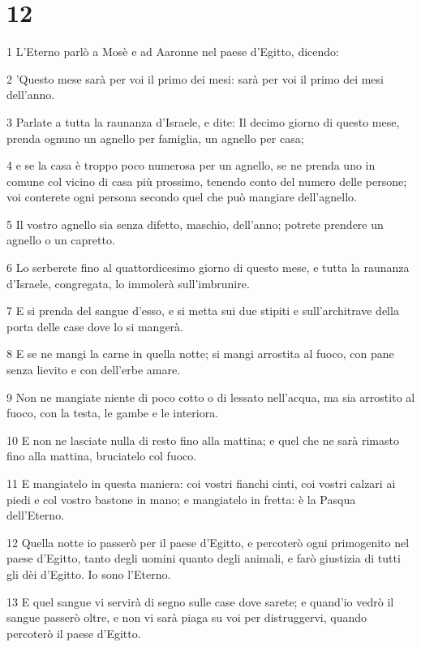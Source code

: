 \chapter{12}

\par 1 L'Eterno parlò a Mosè e ad Aaronne nel paese d'Egitto, dicendo:
\par 2 'Questo mese sarà per voi il primo dei mesi: sarà per voi il primo dei mesi dell'anno.
\par 3 Parlate a tutta la raunanza d'Israele, e dite: Il decimo giorno di questo mese, prenda ognuno un agnello per famiglia, un agnello per casa;
\par 4 e se la casa è troppo poco numerosa per un agnello, se ne prenda uno in comune col vicino di casa più prossimo, tenendo conto del numero delle persone; voi conterete ogni persona secondo quel che può mangiare dell'agnello.
\par 5 Il vostro agnello sia senza difetto, maschio, dell'anno; potrete prendere un agnello o un capretto.
\par 6 Lo serberete fino al quattordicesimo giorno di questo mese, e tutta la raunanza d'Israele, congregata, lo immolerà sull'imbrunire.
\par 7 E si prenda del sangue d'esso, e si metta sui due stipiti e sull'architrave della porta delle case dove lo si mangerà.
\par 8 E se ne mangi la carne in quella notte; si mangi arrostita al fuoco, con pane senza lievito e con dell'erbe amare.
\par 9 Non ne mangiate niente di poco cotto o di lessato nell'acqua, ma sia arrostito al fuoco, con la testa, le gambe e le interiora.
\par 10 E non ne lasciate nulla di resto fino alla mattina; e quel che ne sarà rimasto fino alla mattina, bruciatelo col fuoco.
\par 11 E mangiatelo in questa maniera: coi vostri fianchi cinti, coi vostri calzari ai piedi e col vostro bastone in mano; e mangiatelo in fretta: è la Pasqua dell'Eterno.
\par 12 Quella notte io passerò per il paese d'Egitto, e percoterò ogni primogenito nel paese d'Egitto, tanto degli uomini quanto degli animali, e farò giustizia di tutti gli dèi d'Egitto. Io sono l'Eterno.
\par 13 E quel sangue vi servirà di segno sulle case dove sarete; e quand'io vedrò il sangue passerò oltre, e non vi sarà piaga su voi per distruggervi, quando percoterò il paese d'Egitto.
